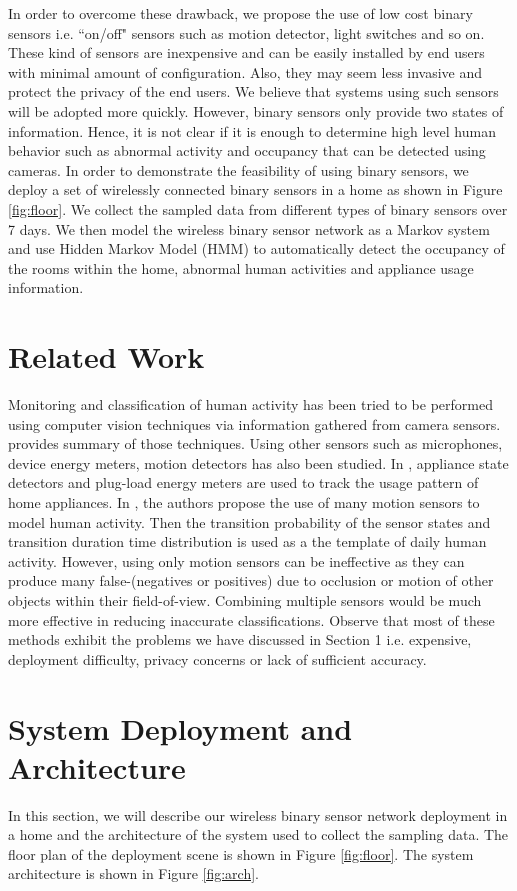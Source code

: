 \documentclass[10pt, conference, compsocconf]{IEEEtran}
\begin{document}
In order to overcome these drawback, we propose the use of low cost binary sensors i.e. ``on/off" sensors such as motion detector, light switches and so on. These kind of sensors are inexpensive and can be easily installed by end users with minimal amount of configuration. Also, they may seem less invasive and protect the privacy of the end users. We believe that systems using such sensors will be adopted more quickly. However, binary sensors only provide two states of information. Hence, it is not clear if it is enough to determine high level human behavior such as abnormal activity and occupancy that can be detected using cameras. In order to demonstrate the feasibility of using binary sensors, we deploy a set of wirelessly connected binary sensors in a home as shown in Figure \ref{fig:floor}. We collect the sampled data from different types of binary sensors over 7 days. We then model the wireless binary sensor network as a Markov system and use Hidden Markov Model (HMM) to automatically detect the occupancy of the rooms within the home, abnormal human activities and appliance usage information.
 
\section{Related Work}
Monitoring and classification of human activity has been tried to be performed using computer vision techniques via information gathered from camera sensors. \cite{2} provides summary of those techniques. Using other sensors such as microphones, device energy meters, motion detectors has also been studied. In \cite{rowe}, appliance state detectors and plug-load energy meters are used to track the usage pattern of home appliances. 
In \cite{4}, the authors propose the use of many motion sensors to model human activity. Then the transition probability of the sensor states and transition duration time distribution is used as a the template of daily human activity. However, using only motion sensors can be ineffective as they can produce many false-(negatives or positives) due to occlusion or motion of other objects within their field-of-view.
Combining multiple sensors would be much more effective in reducing inaccurate classifications.
Observe that most of these methods exhibit the problems we have discussed in Section 1 i.e. expensive, deployment difficulty, privacy concerns or lack of sufficient accuracy. 

 
\section{System Deployment and Architecture}
In this section, we will describe our wireless binary sensor network deployment in a home and the architecture of the system used to collect the sampling data.
The floor plan of the deployment scene is shown in Figure \ref{fig:floor}. The system architecture is shown in Figure \ref{fig:arch}. 
\end{document}
